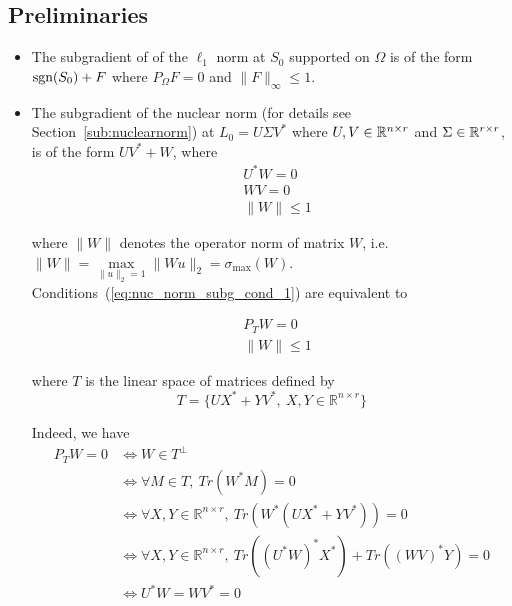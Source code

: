 \subsection{Preliminaries}
\begin{itemize}
\item The subgradient of of the $\ell_1$ norm at $S_0$ supported on $\Omega$ is of the form $\text{sgn}(S_0)+F$ where $P_\Omega F = 0$ and $\|F\|_\infty \leq 1$.
\item The subgradient of the nuclear norm (for details see Section~\ref{sub:nuclearnorm}) at $L_0 = U\Sigma V^*$ where $U, V \in {\mathbb R}^{n \times r}$ and $\Sigma \in {\mathbb R}^{r \times r}$, is of the form $U V^* + W$, where
\begin{equation}
\label{eq:nuc_norm_subg_cond_1}
\begin{aligned}
&U^*W = 0 \\
& WV = 0\\
& \|W\| \leq 1
\end{aligned}
\end{equation}

where $\|W\|$ denotes the operator norm of matrix $W$, i.e. $\|W\| = \underset{\|u\|_2 = 1}{\max} \|Wu\|_2 = \sigma_{\max}(W)$. Conditions~(\ref{eq:nuc_norm_subg_cond_1}) are equivalent to

\begin{equation}
\begin{aligned}
& P_T W = 0 \\
& \|W\| \leq 1
\end{aligned}
\end{equation}

where $T$ is the linear space of matrices defined by
\begin{equation}
\label{eq:T_subspace}
T = \{UX^* + YV^*, \  X, Y \in \mathbb{R}^{n \times r}\}
\end{equation}

Indeed, we have
\begin{align*}
P_TW = 0
&\Leftrightarrow W \in T^\perp  \\
&\Leftrightarrow \forall M \in T, \ Tr(W^*M) = 0\\
&\Leftrightarrow \forall X, Y \in \mathbb{R}^{n \times r}, \ Tr(W^*(UX^* + YV^*)) = 0\\
&\Leftrightarrow \forall X, Y \in \mathbb{R}^{n \times r}, \ Tr((U^*W)^*X^*) + Tr((WV)^*Y) = 0\\
&\Leftrightarrow U^*W = WV^* = 0
\end{align*}


\end{itemize}

